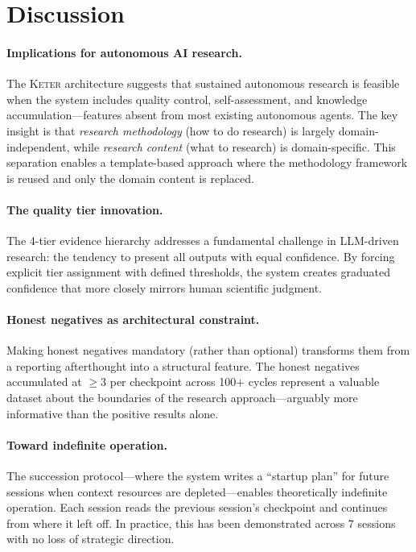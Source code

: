 \documentclass[11pt,a4paper]{article}
\newcommand{\keter}{\textsc{Keter}}
\begin{document}
\section{Discussion}
\label{sec:discussion}

\paragraph{Implications for autonomous AI research.}
The \keter{} architecture suggests that sustained autonomous research is feasible
when the system includes quality control, self-assessment, and knowledge
accumulation---features absent from most existing autonomous agents. The key
insight is that \emph{research methodology} (how to do research) is largely
domain-independent, while \emph{research content} (what to research) is
domain-specific. This separation enables a template-based approach where the
methodology framework is reused and only the domain content is replaced.

\paragraph{The quality tier innovation.}
The 4-tier evidence hierarchy addresses a fundamental challenge in LLM-driven
research: the tendency to present all outputs with equal confidence. By forcing
explicit tier assignment with defined thresholds, the system creates graduated
confidence that more closely mirrors human scientific judgment.

\paragraph{Honest negatives as architectural constraint.}
Making honest negatives mandatory (rather than optional) transforms them from
a reporting afterthought into a structural feature. The honest negatives
accumulated at $\geq$3 per checkpoint across 100+ cycles represent a valuable
dataset about the boundaries of the research approach---arguably more informative
than the positive results alone.

\paragraph{Toward indefinite operation.}
The succession protocol---where the system writes a ``startup plan'' for future
sessions when context resources are depleted---enables theoretically indefinite
operation. Each session reads the previous session's checkpoint and continues
from where it left off. In practice, this has been demonstrated across 7 sessions
with no loss of strategic direction.
\end{document}
